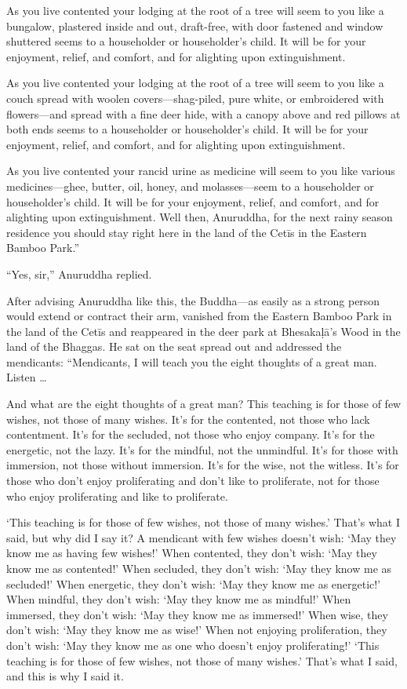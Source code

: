 \documentclass[12pt,openany]{book}%
\begin{document}
As you live contented your lodging at the root of a tree will seem to you like a bungalow, plastered inside and out, draft-free, with door fastened and window shuttered seems to a householder or householder’s child. It will be for your enjoyment, relief, and comfort, and for alighting upon extinguishment. 

As you live contented your lodging at the root of a tree will seem to you like a couch spread with woolen covers—shag-piled, pure white, or embroidered with flowers—and spread with a fine deer hide, with a canopy above and red pillows at both ends seems to a householder or householder’s child. It will be for your enjoyment, relief, and comfort, and for alighting upon extinguishment. 

As you live contented your rancid urine as medicine will seem to you like various medicines—ghee, butter, oil, honey, and molasses—seem to a householder or householder’s child. It will be for your enjoyment, relief, and comfort, and for alighting upon extinguishment. Well then, Anuruddha, for the next rainy season residence you should stay right here in the land of the \textsanskrit{Cetīs} in the Eastern Bamboo Park.” 

“Yes, sir,” Anuruddha replied. 

After advising Anuruddha like this, the Buddha—as easily as a strong person would extend or contract their arm, vanished from the Eastern Bamboo Park in the land of the \textsanskrit{Cetīs} and reappeared in the deer park at \textsanskrit{Bhesakaḷā}’s Wood in the land of the Bhaggas. He sat on the seat spread out and addressed the mendicants: “Mendicants, I will teach you the eight thoughts of a great man. Listen … 

And what are the eight thoughts of a great man? This teaching is for those of few wishes, not those of many wishes. It’s for the contented, not those who lack contentment. It’s for the secluded, not those who enjoy company. It’s for the energetic, not the lazy. It’s for the mindful, not the unmindful. It’s for those with immersion, not those without immersion. It’s for the wise, not the witless. It’s for those who don’t enjoy proliferating and don’t like to proliferate, not for those who enjoy proliferating and like to proliferate. 

‘This teaching is for those of few wishes, not those of many wishes.’ That’s what I said, but why did I say it? A mendicant with few wishes doesn’t wish: ‘May they know me as having few wishes!’ When contented, they don’t wish: ‘May they know me as contented!’ When secluded, they don’t wish: ‘May they know me as secluded!’ When energetic, they don’t wish: ‘May they know me as energetic!’ When mindful, they don’t wish: ‘May they know me as mindful!’ When immersed, they don’t wish: ‘May they know me as immersed!’ When wise, they don’t wish: ‘May they know me as wise!’ When not enjoying proliferation, they don’t wish: ‘May they know me as one who doesn’t enjoy proliferating!’ ‘This teaching is for those of few wishes, not those of many wishes.’ That’s what I said, and this is why I said it. 
\end{document}
